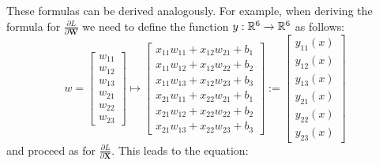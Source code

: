\documentclass{article}
\begin{document}
These formulas can be derived analogously. For example, when deriving the formula for
\(\frac{\partial L}{\partial \mathbf{W}}\) we need to define the function 
\(y: \mathbb{R}^{6} \rightarrow \mathbb{R}^{6}\) as follows:
\[
    w = \begin{bmatrix}
        w_{11} \\
        w_{12} \\
        w_{13} \\
        w_{21} \\
        w_{22} \\
        w_{23}
    \end{bmatrix} \mapsto \begin{bmatrix}
        x_{11}w_{11} + x_{12}w_{21} + b_{1} \\
        x_{11}w_{12} + x_{12}w_{22} + b_{2} \\
        x_{11}w_{13} + x_{12}w_{23} + b_{3} \\
        x_{21}w_{11} + x_{22}w_{21} + b_{1} \\
        x_{21}w_{12} + x_{22}w_{22} + b_{2} \\
        x_{21}w_{13} + x_{22}w_{23} + b_{3}
    \end{bmatrix} := \begin{bmatrix}
        y_{11}(x) \\
        y_{12}(x) \\
        y_{13}(x) \\
        y_{21}(x) \\
        y_{22}(x) \\
        y_{23}(x)
    \end{bmatrix}
\]
and proceed as for \(\frac{\partial L}{\partial \mathbf{X}}\). This leads to 
the equation:
\setlength{\arraycolsep}{1.3pt}
\end{document}
